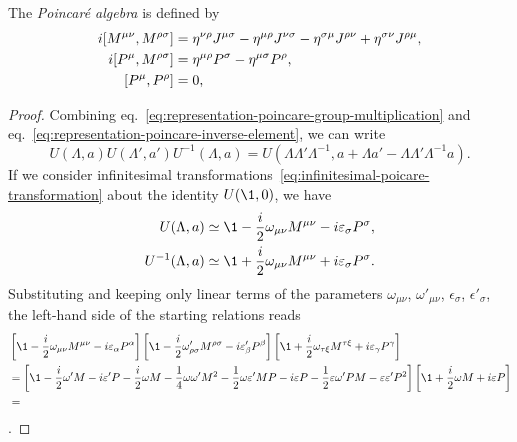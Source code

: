 The \emph{Poincaré algebra} is defined by
\begin{subequations}
    \begin{align}
    i \comm{M^{\mu\nu}}{M^{\rho\sigma}} &= \eta^{\nu\rho} J^{\mu\sigma} - \eta^{\mu\rho} J^{\nu\sigma} - \eta^{\sigma\mu} J^{\rho\nu} + \eta^{\sigma\nu} J^{\rho\mu} , \\
    i \comm{P^\mu}{M^{\rho\sigma}} &= \eta^{\mu\rho} P^\sigma - \eta^{\mu\sigma} P^\rho , \\
        \comm{P^\mu}{P^\rho} &= 0 ,
\end{align}
\end{subequations}
\begin{proof}
    Combining eq.~\eqref{eq:representation-poincare-group-multiplication} and eq.~\eqref{eq:representation-poincare-inverse-element}, we can write
    \begin{equation*}
        U(\Lambda, a) U(\Lambda',a') U^{-1}(\Lambda,a) = U(\Lambda \Lambda' \Lambda^{-1}, a + \Lambda a' - \Lambda \Lambda' \Lambda^{-1}a) .
    \end{equation*}
    If we consider infinitesimal transformations~\eqref{eq:infinitesimal-poicare-transformation} about the identity $U(\1,0)$, we have
    \begin{align*}
        U(\Lambda,a) &\simeq \1 -\frac{i}{2} \omega_{\mu\nu} M^{\mu\nu} - i \epsilon_\sigma P^\sigma, \\ 
        {U^{-1}}(\Lambda,a) &\simeq \1 +\frac{i}{2} \omega_{\mu\nu} M^{\mu\nu} + i \epsilon_\sigma P^\sigma .
    \end{align*}
    Substituting and keeping only linear terms of the parameters $\omega_{\mu\nu}$, $\omega'_{\mu\nu}$, $\epsilon_\sigma$, $\epsilon'_\sigma$, the left-hand side of the starting relations reads
    \begin{align*}
        &\left[ \1 -\frac{i}{2} \omega_{\mu\nu} M^{\mu\nu} - i \epsilon_\alpha P^\alpha  \right] \left[ \1 -\frac{i}{2} \omega'_{\rho\sigma} M^{\rho\sigma} - i \epsilon'_\beta P^\beta  \right] \left[ \1 +\frac{i}{2} \omega_{\tau\xi} M^{\tau\xi} + i \epsilon_\gamma P^\gamma  \right] \\
        &=\left[ \1 - \frac{i}{2} \omega' M - i \epsilon' P - \frac{i}{2} \omega M - \frac{1}{4} \omega \omega' M^2 - \frac{1}{2} \omega \epsilon' M P - i \epsilon P - \frac{1}{2} \epsilon \omega' P M - \epsilon \epsilon' P^2 \right] \left[ \1 + \frac{i}{2} \omega M + i \epsilon P  \right] \\
        &= 
    \end{align*}.
\end{proof}
    

